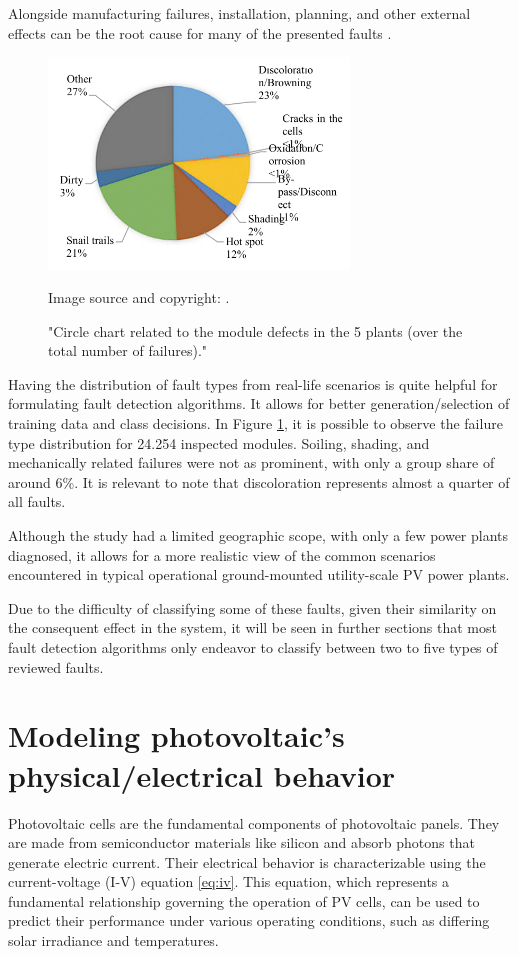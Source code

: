 Alongside manufacturing failures, installation, planning, and other external effects can be the root cause for many of the presented faults \cite{sunny}.

\begin{figure}[h]
    \centering
    \includegraphics[width=8cm]{figures/chapter2/chartfailsurvey.png} \caption{"Circle chart related to the module defects in the 5 plants (over the total number of failures)."} Image source and copyright: \cite{Grimaccia2017}.
    \label{fig:faultchart}
\end{figure}

Having the distribution of fault types from real-life scenarios is quite helpful for formulating fault detection algorithms. It allows for better generation/selection of training data and class decisions. In Figure \ref{fig:faultchart}, it is possible to observe the failure type distribution for 24.254 inspected modules. Soiling, shading, and mechanically related failures were not as prominent, with only a group share of around 6\%. It is relevant to note that discoloration represents almost a quarter of all faults.

Although the study had a limited geographic scope, with only a few power plants diagnosed, it allows for a more realistic view of the common scenarios encountered in typical operational ground-mounted utility-scale PV power plants.

Due to the difficulty of classifying some of these faults, given their similarity on the consequent effect in the system, it will be seen in further sections that most fault detection algorithms only endeavor to classify between two to five types of reviewed faults.

\section{Modeling photovoltaic's physical/electrical behavior}

Photovoltaic cells are the fundamental components of photovoltaic panels. They are made from semiconductor materials like silicon and absorb photons that generate electric current. Their electrical behavior is characterizable using the current-voltage (I-V) equation \ref{eq:iv}. This equation, which represents a fundamental relationship governing the operation of PV cells, can be used to predict their performance under various operating conditions, such as differing solar irradiance and temperatures.


